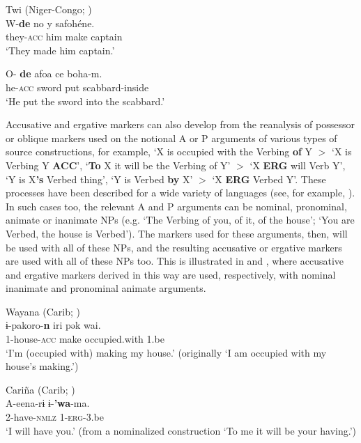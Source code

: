 \documentclass[output=paper]{langsci/langscibook}
\begin{document}
\ea\label{twi}
Twi (Niger-Congo; )\\
\ea
\gll W{}-\textbf{{de}} no y{}{} {}safohéne.\\
they-\textsc{acc} him make captain\\
\glt `They made him captain.' 

\ex
\gll O-\textbf{{ de}} afoa ce boha-m.\\
he-\textsc{acc} sword put scabbard-inside\\
\glt `He put the sword into the scabbard.' 

\z
\z



Accusative and ergative markers  can  also develop from the
  reanalysis of possessor or oblique markers used on the notional A or
  P arguments of various types of source constructions, for example,
  `X is occupied with the Verbing  {\bf of} Y $>$ `X
        is Verbing Y {\bf ACC}', `{\bf To} X it will be the Verbing
        of Y' $>$ `X {\bf ERG} 
        will Verb Y',  `Y is X{\bf 's} Verbed thing', `Y is
        Verbed {\bf by} X'
        $>$ `X {\bf ERG} Verbed Y'. These processes have been described for
        a wide variety of languages (see, for example,
     \citealt{HarrisCampbell1995,Bubenik1998,Gildea1998,Creissels2008}). In such cases
        too,  the relevant A and P arguments can be nominal,
        pronominal, animate or inanimate NPs (e.g. `The Verbing of
        you, of it, of the house'; `You are Verbed, the house is
        Verbed'). The  markers used for these arguments, then,  will
        be used with all of these NPs, and the resulting accusative or
        ergative markers are used with all of these NPs too. This is
        illustrated in  and , where accusative and
        ergative markers derived in this way are used, respectively,
        with nominal inanimate and pronominal animate arguments.

\ea\label{wayana}
Wayana (Carib;  )\\
\gll ​ɨ-pakoro-\textbf{{n}} iri pək wai.\\
1-house-\textsc{acc} make occupied.with 1.be\\
\glt `I'm (occupied with) making my house.' (originally `I am occupied with my house's making.')

\z

\ea\label{carina}
Cari\~na (Carib;  )\\
\gll A-eena-r​ɨ ​ɨ-\textbf{{'wa}}-ma.\\
2-have-\textsc{nmlz} 1-\textsc{erg}-3.be\\
\glt `I will have you.' (from a nominalized construction `To me it will be your having.')
\end{document}
